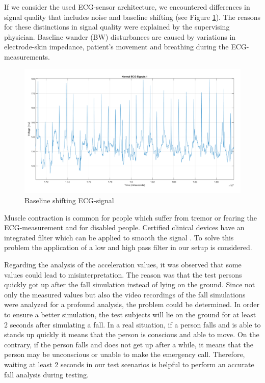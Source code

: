 \documentclass[review]{elsarticle}
\begin{document}
If we consider the used ECG-sensor architecture, we encountered differences in signal quality that includes noise and baseline shifting (see Figure \ref{fig:ECGBaselineShifting}). The reasons for these distinctions in signal quality were explained by the supervising physician. Baseline wander (BW) disturbances are caused by variations in electrode-skin impedance, patient's movement and breathing during the ECG-measurements.
\begin{figure}[!ht]
	\centering
	\includegraphics[scale=0.275]{Images/NormalECG1.png}
	\caption[Measured ECG-signal]{Baseline shifting ECG-signal}
	\label{fig:ECGBaselineShifting}
\end{figure}
 Muscle contraction is common for people which suffer from tremor or fearing the ECG-measurement and for disabled people. Certified clinical devices have an integrated filter which can be applied to smooth the signal \cite{ECGNoise,DrNicoletteWagner}. To solve this problem the application of a low and high pass filter in our setup is considered.

Regarding the analysis of the acceleration values, it was observed that some values could lead to misinterpretation. The reason was that the test persons quickly got up after the fall simulation instead of lying on the ground.
Since not only the measured values but also the video recordings of the fall simulations were analyzed for a profound analysis, the problem could be determined. In order to ensure a better simulation, the test subjects will lie on the ground for at least 2 seconds after simulating a fall. In a real situation, if a person falls and is able to stands up quickly it means that the person is conscious and able to move. On the contrary, if the person falls and does not get up after a while, it means that the person may be unconscious or unable to make the emergency call.  Therefore, waiting at least 2 seconds in our test scenarios is helpful to perform an accurate fall analysis during testing.
\end{document}
